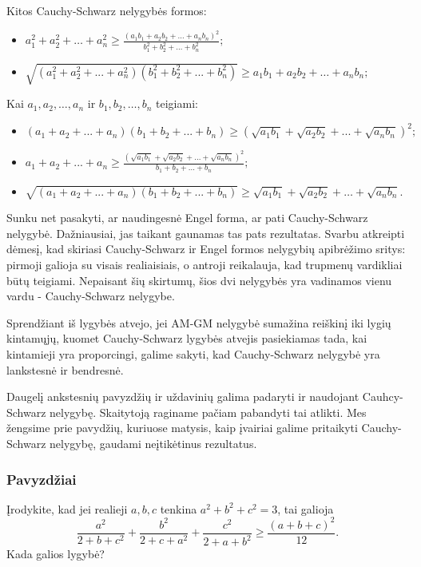Kitos Cauchy-Schwarz nelygybės formos:
\begin{itemize}
  \item $a_1^2+a_2^2+\ldots+a_n^2\geq\frac{(a_1b_1+a_2b_2+\ldots+a_nb_n)^2}{b_1^2+b_2^2+\ldots+b_n^2};$
  \item $\sqrt{(a_1^2+a_2^2+...+a_n^2)(b_1^2+b_2^2+...+b_n^2)}\geq a_1b_1+a_2b_2+\ldots+a_nb_n;$
\end{itemize}

Kai $a_1,a_2,\ldots,a_n$ ir $b_1,b_2,\ldots,b_n$ teigiami:
\begin{itemize}
  \item $(a_1+a_2+...+a_n)(b_1+b_2+...+b_n)\geq(\sqrt{a_1b_1}+\sqrt{a_2b_2}+...+\sqrt{a_nb_n})^2; $
  \item $a_1+a_2+...+a_n\geq\frac{(\sqrt{a_1b_1}+\sqrt{a_2b_2}+...+\sqrt{a_nb_n})^2}{b_1+b_2+...+b_n};$
  \item $\sqrt{(a_1+a_2+...+a_n)(b_1+b_2+...+b_n)}\geq \sqrt{a_1b_1}+\sqrt{a_2b_2}+\ldots+\sqrt{a_nb_n}.$
\end{itemize}

Sunku net pasakyti, ar naudingesnė Engel forma, ar pati Cauchy-Schwarz
nelygybė. Dažniausiai, jas taikant gaunamas tas pats rezultatas. Svarbu
atkreipti dėmesį, kad skiriasi Cauchy-Schwarz ir Engel formos nelygybių
apibrėžimo sritys: pirmoji galioja su visais realiaisiais, o antroji
reikalauja, kad trupmenų vardikliai būtų teigiami. Nepaisant šių skirtumų,
šios dvi nelygybės yra vadinamos vienu vardu - Cauchy-Schwarz nelygybe.

Sprendžiant iš lygybės atvejo, jei AM-GM nelygybė sumažina reiškinį iki
lygių kintamųjų, kuomet Cauchy-Schwarz  lygybės atvejis pasiekiamas tada,
kai kintamieji yra proporcingi, galime sakyti, kad Cauchy-Schwarz nelygybė
yra lankstesnė ir bendresnė.

Daugelį ankstesnių pavyzdžių ir uždavinių galima padaryti ir naudojant
Cauhcy-Schwarz nelygybę. Skaitytoją raginame pačiam pabandyti tai atlikti.
Mes žengsime prie pavydžių, kuriuose matysis, kaip įvairiai galime
pritaikyti Cauchy-Schwarz nelygybę, gaudami neįtikėtinus rezultatus.

\subsubsection{Pavyzdžiai}

\begin{pavnr}
  Įrodykite, kad jei realieji $a,b,c$ tenkina $a^2+b^2+c^2=3$, tai galioja
  $$\frac{a^2}{2+b+c^2}+\frac{b^2}{2+c+a^2}+\frac{c^2}{2+a+b^2}\geq\frac{(a+b+c)^2}{12}.$$
  Kada galios lygybė?
\end{pavnr}


